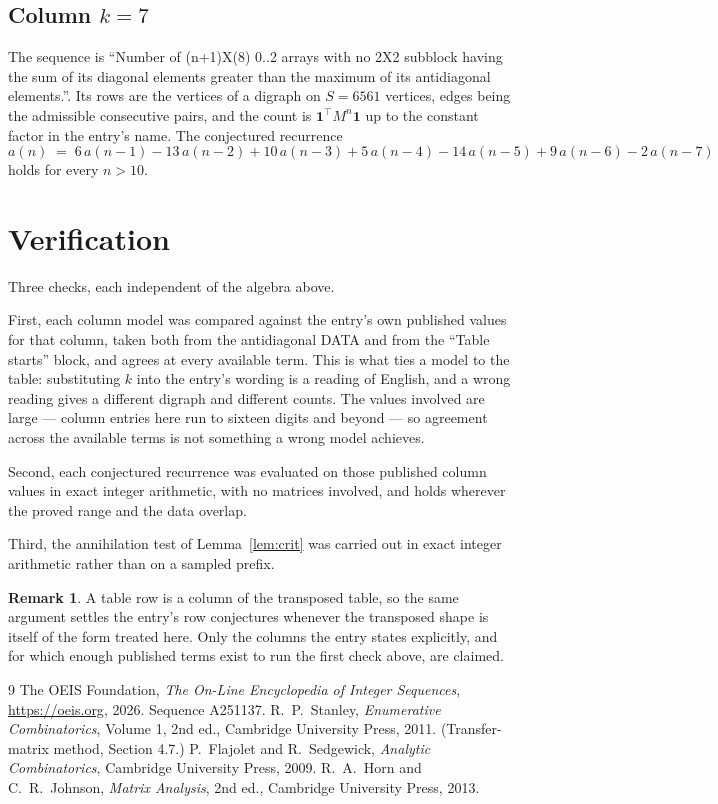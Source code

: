 \documentclass[11pt,a4paper]{article}
\theoremstyle{plain}
\theoremstyle{definition}
\newtheorem{remark}[theorem]{Remark}
\begin{document}
\subsection*{Column $k=7$}
The sequence is ``Number of (n+1)X(8) 0..2 arrays with no 2X2 subblock having the sum of its diagonal elements greater than the maximum of its antidiagonal elements.''. Its rows are the vertices of a digraph on
$S=6561$ vertices, edges being the admissible consecutive pairs, and the count is
$\mathbf{1}^{\!\top}M^{n}\mathbf{1}$ up to the constant factor in the entry's name.
The conjectured recurrence
\[
a(n)\;=\;6\,a(n-1) - 13\,a(n-2) + 10\,a(n-3) + 5\,a(n-4) - 14\,a(n-5) + 9\,a(n-6) - 2\,a(n-7)
\]
holds for every $n>10$.

\section{Verification}

Three checks, each independent of the algebra above.

First, each column model was compared against the entry's own published values for that
column, taken both from the antidiagonal DATA and from the ``Table starts'' block, and agrees
at every available term. This is what ties a model to the table: substituting $k$ into the
entry's wording is a reading of English, and a wrong reading gives a different digraph and
different counts. The values involved are large --- column entries here run to sixteen digits
and beyond --- so agreement across the available terms is not something a wrong model
achieves.

Second, each conjectured recurrence was evaluated on those published column values in exact
integer arithmetic, with no matrices involved, and holds wherever the proved range and the
data overlap.

Third, the annihilation test of Lemma~\ref{lem:crit} was carried out in exact integer
arithmetic rather than on a sampled prefix.

\begin{remark}
A table row is a column of the transposed table, so the same argument settles the entry's row
conjectures whenever the transposed shape is itself of the form treated here. Only the columns
the entry states explicitly, and for which enough published terms exist to run the first check
above, are claimed.
\end{remark}

\begin{thebibliography}{9}
 The OEIS Foundation, \emph{The On-Line Encyclopedia of Integer
Sequences}, \url{https://oeis.org}, 2026. Sequence A251137.
 R.~P.~Stanley, \emph{Enumerative Combinatorics}, Volume 1, 2nd ed.,
Cambridge University Press, 2011. (Transfer-matrix method, Section 4.7.)
 P.~Flajolet and R.~Sedgewick, \emph{Analytic Combinatorics}, Cambridge
University Press, 2009.
 R.~A.~Horn and C.~R.~Johnson, \emph{Matrix Analysis}, 2nd ed., Cambridge
University Press, 2013.
\end{thebibliography}
\end{document}
